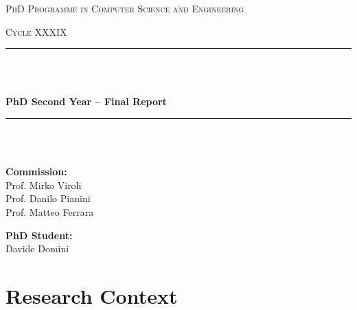 \documentclass[runningheads]{llncs}
\begin{document}
\begin{titlepage}
    \centering
    \vspace*{2cm}
    
    {\scshape\Large PhD Programme in Computer Science and Engineering \par}
    \vspace{0.5cm}
    {\scshape\large Cycle XXXIX \par}
    \vspace{0.5cm}

    \rule{\linewidth}{0.4mm} \\ [0.1mm]
    \raisebox{0.2cm}{\rule{\linewidth}{0.8mm}} \\[0.8cm]
    {\huge\bfseries PhD Second Year -- Final Report \par}
    \vspace{0.8cm}
    \rule{\linewidth}{0.8mm} \\ [0.1pt]
    \raisebox{0.2cm}{\rule{\linewidth}{0.4mm}} \\[1.5cm]
    

    \vspace{1.5cm}
    
    \noindent
    \begin{minipage}[t]{0.45\textwidth}
        \raggedright
        \textbf{Commission:}\\[0.5cm]
        Prof. Mirko Viroli\\
        Prof. Danilo Pianini\\
        Prof. Matteo Ferrara
    \end{minipage}%
    \hfill
    \begin{minipage}[t]{0.45\textwidth}
        \raggedleft
        \textbf{PhD Student:}\\[0.5cm]
        Davide Domini
    \end{minipage}
    
    \vfill
    
\end{titlepage}

\section{Research Context}\label{sec:intro}
\end{document}
